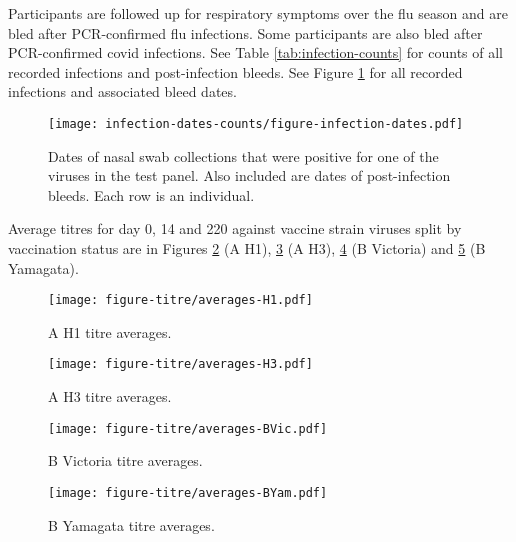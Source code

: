 \documentclass[12pt]{article}
\begin{document}
Participants are followed up for respiratory symptoms over the flu season and are bled after PCR-confirmed flu infections. Some participants are also bled after PCR-confirmed covid infections.
See Table \ref{tab:infection-counts} for counts of all recorded infections and post-infection bleeds.
See Figure \ref{fig:postinf-bleed-dates} for all recorded infections and associated bleed dates.



\begin{figure}
	\texttt{[image: infection-dates-counts/figure-infection-dates.pdf]}
	\caption{Dates of nasal swab collections that were positive for one of the viruses in the test panel. Also included are dates of post-infection bleeds. Each row is an individual.}
	\label{fig:postinf-bleed-dates}
\end{figure}

Average titres for day 0, 14 and 220 against vaccine strain viruses split by vaccination status are in Figures \ref{fig:titre-averages-H1} (A H1), \ref{fig:titre-averages-H3} (A H3), \ref{fig:titre-averages-BVic} (B Victoria) and \ref{fig:titre-averages-BYam} (B Yamagata).

\begin{figure}
	\texttt{[image: figure-titre/averages-H1.pdf]}
	\caption{A H1 titre averages.}
	\label{fig:titre-averages-H1}
\end{figure}

\begin{figure}
	\texttt{[image: figure-titre/averages-H3.pdf]}
	\caption{A H3 titre averages.}
	\label{fig:titre-averages-H3}
\end{figure}

\begin{figure}
	\texttt{[image: figure-titre/averages-BVic.pdf]}
	\caption{B Victoria titre averages.}
	\label{fig:titre-averages-BVic}
\end{figure}

\begin{figure}
	\texttt{[image: figure-titre/averages-BYam.pdf]}
	\caption{B Yamagata titre averages.}
	\label{fig:titre-averages-BYam}
\end{figure}
\end{document}
